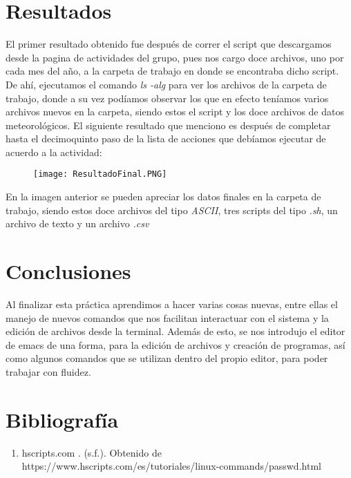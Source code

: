 \documentclass{article}
\begin{document}
\section{Resultados}
El primer resultado obtenido fue después de correr el script que descargamos desde la pagina de actividades del grupo, pues nos cargo doce archivos, uno por cada mes del año, a la carpeta de trabajo en donde se encontraba dicho script. \\ De ahí, ejecutamos el comando \textit{ls -alg} para ver los archivos de la carpeta de trabajo, donde a su vez podíamos observar los que en efecto teníamos varios archivos nuevos en la carpeta, siendo estos el script y los doce archivos de datos meteorológicos.
El siguiente resultado que menciono es después de completar hasta el decimoquinto paso de la lista de acciones que debíamos ejecutar de acuerdo a la actividad:

 \begin{figure}[htb]
    \begin{center}
    \texttt{[image: ResultadoFinal.PNG]}
    \end{center}
    \end{figure}

En la imagen anterior se pueden apreciar los datos finales en la carpeta de trabajo, siendo estos doce archivos del tipo \textit{ASCII}, tres scripts del tipo \textit{.sh}, un archivo de texto y un archivo \textit{.csv}

\section{Conclusiones}
Al finalizar esta práctica aprendimos a hacer varias cosas nuevas, entre ellas el manejo de nuevos comandos que nos facilitan interactuar con el sistema y la edición de archivos desde la terminal. Además de esto, se nos introdujo el editor de emacs de una forma, para la edición de archivos y creación de programas, así como algunos comandos que se utilizan dentro del propio editor, para poder trabajar con fluidez.

\section{Bibliografía}
\begin{enumerate}
\item hscripts.com . (s.f.). Obtenido de https://www.hscripts.com/es/tutoriales/linux-commands/passwd.html
\end{enumerate}
 
\end{document}
